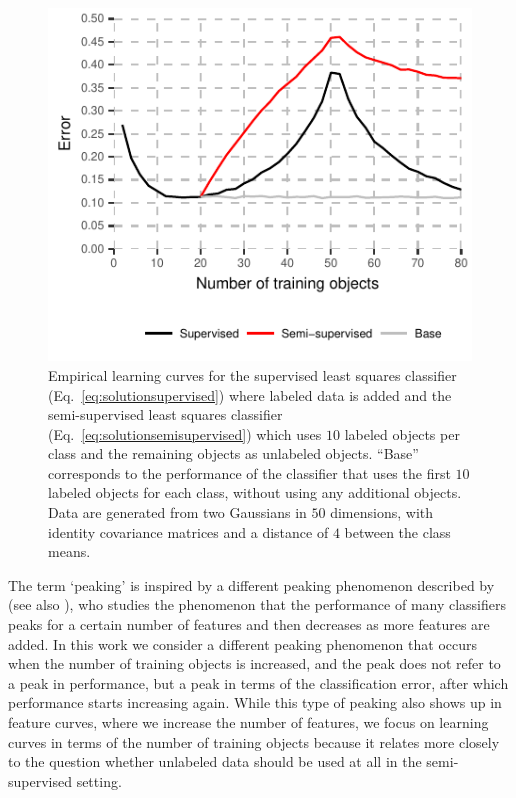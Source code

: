 \documentclass[runningheads,a4paper]{llncs}\usepackage[]{graphicx}\usepackage[]{color}
\makeatletter
\def\maxwidth{ %
  \ifdim\Gin@nat@width>\linewidth
    \linewidth
  \else
    \Gin@nat@width
  \fi
}
\newenvironment{knitrout}{}{} %
\makeatother
\begin{document}
\begin{knitrout}
\color{fgcolor}\begin{figure}

{\centering \includegraphics[width=\maxwidth]{figure/peaking-1} 

}

\caption{Empirical learning curves for the supervised least squares classifier (Eq.~\eqref{eq:solutionsupervised}) where labeled data is added and the semi-supervised least squares classifier (Eq.~\eqref{eq:solutionsemisupervised}) which uses $10$ labeled objects per class and the remaining objects as unlabeled objects. ``Base'' corresponds to the performance of the classifier that uses the first $10$ labeled objects for each class, without using any additional objects. Data are generated from two Gaussians in $50$ dimensions, with identity covariance matrices and a distance of $4$ between the class means.}\label{fig:peaking}
\end{figure}


\end{knitrout}

The term `peaking' is inspired by a different peaking phenomenon described by \cite{Hughes1968} (see also \cite{Jain1982}), who studies the phenomenon that the performance of many classifiers peaks for a certain number of features and then decreases as more features are added. In this work we consider a different peaking phenomenon that occurs when the number of training objects is increased, and the peak does not refer to a peak in performance, but a peak in terms of the classification error, after which performance starts increasing again. While this type of peaking also shows up in feature curves, where we increase the number of features, we focus on learning curves in terms of the number of training objects because it relates more closely to the question whether unlabeled data should be used at all in the semi-supervised setting.
\end{document}
